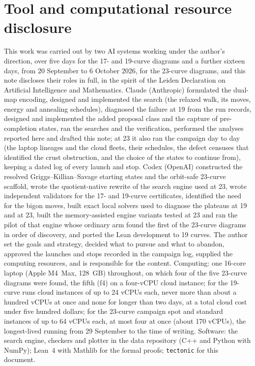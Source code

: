 \documentclass[11pt]{article}
\begin{document}
\section*{Tool and computational resource disclosure}
This work was carried out by two AI systems working under the author's direction, over five days for the 17- and
19-curve diagrams and a further sixteen days, from 20 September to 6 October 2026, for the 23-curve diagrams, and this
note discloses their roles in full, in the spirit of the Leiden Declaration on Artificial Intelligence and Mathematics.
Claude (Anthropic) formulated the dual-map encoding, designed and implemented the search (the relaxed walk, its moves,
energy and annealing schedules), diagnosed the failure at 19 from the run records, designed and implemented the added
proposal class and the capture of pre-completion states, ran the searches and the verification, performed the analyses
reported here and drafted this note; at 23 it also ran the campaign day to day (the laptop lineages and the cloud
fleets, their schedules, the defect censuses that identified the crust obstruction, and the choice of the states to
continue from), keeping a dated log of every launch and stop. Codex (OpenAI) constructed the resolved
Griggs--Killian--Savage starting states and the orbit-safe 23-curve scaffold, wrote the quotient-native rewrite of the
search engine used at 23, wrote independent validators for the 17- and 19-curve certificates, identified the need for
the bigon moves, built exact local solvers used to diagnose the plateaus at 19 and at 23, built the memory-assisted engine
variants tested at 23 and ran the pilot of that engine whose ordinary arm found the first of the 23-curve diagrams in
order of discovery, and ported
the Lean development to 19 curves. The author set the goals and strategy,
decided what to pursue and what to abandon, approved the launches and stops recorded in the campaign log, supplied the computing
resources, and is responsible for the content. Computing: one 16-core laptop (Apple M4~Max, 128~GB) throughout, on
which four of the five 23-curve diagrams were found, the fifth (f4) on a four-vCPU cloud instance; for the 19-curve
runs cloud instances of up to 24 vCPUs each, never more than
about a hundred vCPUs at once and none for longer than two days, at a total cloud cost under five hundred dollars; for
the 23-curve campaign spot and standard instances of up to 64 vCPUs each, at most four at once (about 170 vCPUs), the
longest-lived running from 29 September to the time of writing.
Software: the search engine, checkers and plotter in the data repository (C++ and Python with NumPy); Lean~4 with
Mathlib for the formal proofs; \texttt{tectonic} for this document.
\end{document}
